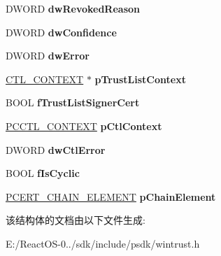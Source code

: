 \begin{DoxyCompactItemize}
D\+W\+O\+RD {\bfseries dw\+Revoked\+Reason}
\item 
\mbox{\label{struct___c_r_y_p_t___p_r_o_v_i_d_e_r___c_e_r_t_a48e56259ce0221cae74c258b557f3af1}} 
D\+W\+O\+RD {\bfseries dw\+Confidence}
\item 
\mbox{\label{struct___c_r_y_p_t___p_r_o_v_i_d_e_r___c_e_r_t_afafa3174c1516fe4167dff4003d2440d}} 
D\+W\+O\+RD {\bfseries dw\+Error}
\item 
\mbox{\label{struct___c_r_y_p_t___p_r_o_v_i_d_e_r___c_e_r_t_a39347f519e65afef9bfd7c4ee3c790c9}} 
\hyperlink{struct___c_t_l___c_o_n_t_e_x_t}{C\+T\+L\+\_\+\+C\+O\+N\+T\+E\+XT} $\ast$ {\bfseries p\+Trust\+List\+Context}
\item 
\mbox{\label{struct___c_r_y_p_t___p_r_o_v_i_d_e_r___c_e_r_t_a0e08937b6c1f7e7f34e7e760d41c37a0}} 
B\+O\+OL {\bfseries f\+Trust\+List\+Signer\+Cert}
\item 
\mbox{\label{struct___c_r_y_p_t___p_r_o_v_i_d_e_r___c_e_r_t_a99fb1e67cb6ffb867948fcc763f8e181}} 
\hyperlink{struct___c_t_l___c_o_n_t_e_x_t}{P\+C\+C\+T\+L\+\_\+\+C\+O\+N\+T\+E\+XT} {\bfseries p\+Ctl\+Context}
\item 
\mbox{\label{struct___c_r_y_p_t___p_r_o_v_i_d_e_r___c_e_r_t_a9585f99bfaf3346b943325e99e9ca805}} 
D\+W\+O\+RD {\bfseries dw\+Ctl\+Error}
\item 
\mbox{\label{struct___c_r_y_p_t___p_r_o_v_i_d_e_r___c_e_r_t_aafa9142bb7a6949bf94eaa4f132e2182}} 
B\+O\+OL {\bfseries f\+Is\+Cyclic}
\item 
\mbox{\label{struct___c_r_y_p_t___p_r_o_v_i_d_e_r___c_e_r_t_a7ef603eac54a293fed4efc57f76f27db}} 
\hyperlink{struct___c_e_r_t___c_h_a_i_n___e_l_e_m_e_n_t}{P\+C\+E\+R\+T\+\_\+\+C\+H\+A\+I\+N\+\_\+\+E\+L\+E\+M\+E\+NT} {\bfseries p\+Chain\+Element}
\end{DoxyCompactItemize}


该结构体的文档由以下文件生成\+:\begin{DoxyCompactItemize}
\item 
E\+:/\+React\+O\+S-\/0../sdk/include/psdk/wintrust.\+h\end{DoxyCompactItemize}
